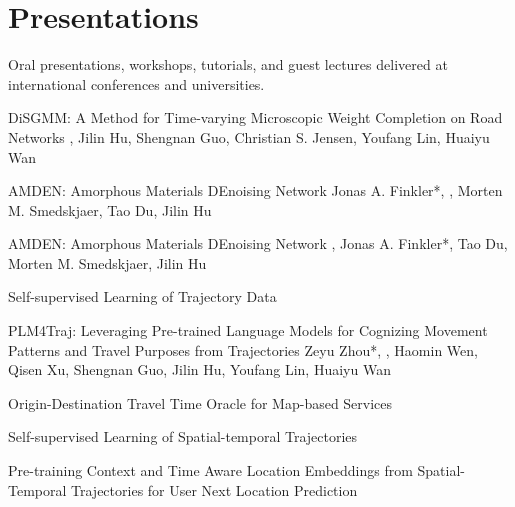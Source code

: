 \label{sec:presentations}
\section*{Presentations}
Oral presentations, workshops, tutorials, and guest lectures delivered at international conferences and universities.

{DiSGMM: A Method for Time-varying Microscopic Weight Completion on Road Networks}
{\me, Jilin Hu, Shengnan Guo, Christian S. Jensen, Youfang Lin, Huaiyu Wan}{}

{AMDEN: Amorphous Materials DEnoising Network}
{Jonas A. Finkler*, \me*, Morten M. Smedskjaer, Tao Du, Jilin Hu}{}

{AMDEN: Amorphous Materials DEnoising Network}
{\me*, Jonas A. Finkler*, Tao Du, Morten M. Smedskjaer, Jilin Hu}{}

{Self-supervised Learning of Trajectory Data}
{}{}

{PLM4Traj: Leveraging Pre-trained Language Models for Cognizing Movement Patterns and Travel Purposes from Trajectories}
{Zeyu Zhou*, \me*, Haomin Wen, Qisen Xu, Shengnan Guo, Jilin Hu, Youfang Lin, Huaiyu Wan}{}

{Origin-Destination Travel Time Oracle for Map-based Services}
{}{}

{Self-supervised Learning of Spatial-temporal Trajectories}
{}{}

{Pre-training Context and Time Aware Location Embeddings from Spatial-Temporal Trajectories for User Next Location Prediction}
{}{}
